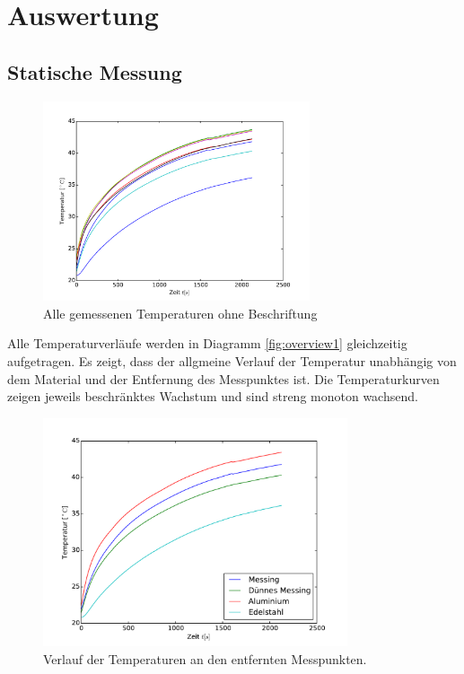 \section{Auswertung}
\label{sec:Auswertung}
\subsection{Statische Messung}
\begin{figure}
	\centering
	\includegraphics[width=0.7\textwidth]{Bilder/M1_Overview.pdf}
	\caption{Alle gemessenen Temperaturen ohne Beschriftung}
\end{figure}
Alle Temperaturverläufe werden in Diagramm \ref{fig:overview1} gleichzeitig aufgetragen. Es zeigt, dass der allgmeine Verlauf der Temperatur unabhängig von dem Material und der Entfernung des Messpunktes ist. Die Temperaturkurven zeigen jeweils beschränktes Wachstum und sind streng monoton wachsend.
\begin{figure}[p]
	\label{fig:entftemp}
	\centering
	\includegraphics[width=0.8\textwidth]{Bilder/M1_Tempverl.pdf}
	\caption{Verlauf der Temperaturen an den entfernten Messpunkten.}
	\label{fig:entftemp}
\end{figure}
